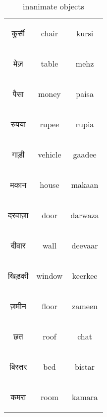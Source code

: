 \begin{table}[H]
    \centering 
    \begin{tabular}{c|c|c}
        \begin{hindi} कुर्सी \end{hindi} & chair & kursi \\
        \begin{hindi} मेज़ \end{hindi} & table & mehz \\
        \begin{hindi} पैसा \end{hindi} & money & paisa \\
        \begin{hindi} रुपया \end{hindi} & rupee & rupia \\
        \begin{hindi} गाड़ी \end{hindi} & vehicle & gaadee \\
        \begin{hindi} मकान \end{hindi} & house & makaan \\
        \begin{hindi} दरवाज़ा \end{hindi} & door & darwaza \\
        \begin{hindi} दीवार \end{hindi} & wall & deevaar \\
        \begin{hindi} खिड़की \end{hindi} & window & keerkee \\
        \begin{hindi} ज़मीन \end{hindi} & floor & zameen \\
        \begin{hindi} छत \end{hindi} & roof & chat \\
        \begin{hindi} बिस्तर \end{hindi} & bed & bistar \\
        \begin{hindi} कमरा \end{hindi} & room & kamara \\

    \end{tabular}
    \caption{inanimate objects}
    \label{tab:nouns_inanimate}
\end{table}







